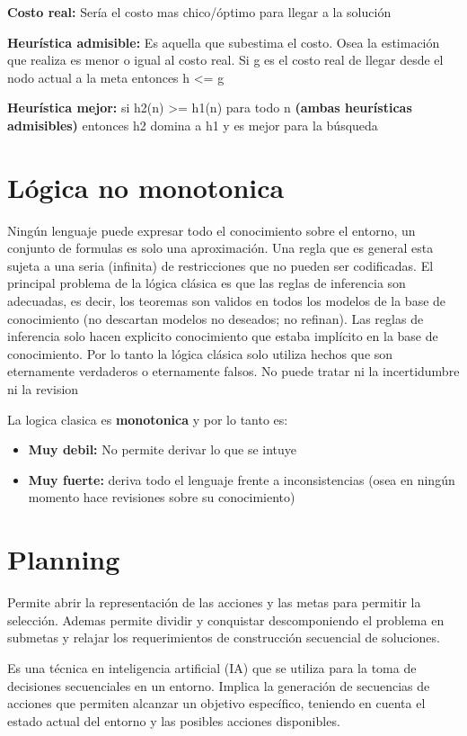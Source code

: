 \textbf{Costo real: }Sería el costo mas chico/óptimo para llegar a la solución

\textbf{Heurística admisible: }Es aquella que subestima el costo. Osea la estimación que realiza es menor o igual al costo real. Si g es el costo real de llegar desde el nodo actual a la meta entonces h <= g 

\textbf{Heurística mejor: }si h2(n) >= h1(n) para todo n \textbf{(ambas heurísticas admisibles)} entonces h2 domina a h1 y es mejor para la búsqueda


\section{Lógica no monotonica}
Ningún lenguaje puede expresar todo el conocimiento sobre el entorno, un conjunto de formulas es solo una aproximación. Una regla que es general esta sujeta a una seria (infinita) de restricciones que no pueden ser codificadas. El principal problema de la lógica clásica es que las reglas de inferencia son adecuadas, es decir, los teoremas son validos en todos los modelos de la base de conocimiento (no descartan modelos no deseados; no refinan). Las reglas de inferencia solo hacen explicito conocimiento que estaba implícito en la base de conocimiento. Por lo tanto la lógica clásica solo utiliza hechos que son eternamente verdaderos o eternamente falsos. No puede tratar ni la incertidumbre ni la revision

La logica clasica es \textbf{monotonica} y por lo tanto es:
\begin{itemize}
  \item \textbf{Muy debil: }No permite derivar lo que se intuye
  \item \textbf{Muy fuerte: }deriva todo el lenguaje frente a inconsistencias (osea en ningún momento hace revisiones sobre su conocimiento)
\end{itemize}

\section{Planning} 
Permite abrir la representación de las acciones y las metas para permitir la selección. Ademas permite dividir y conquistar descomponiendo el problema en submetas y relajar los requerimientos de construcción secuencial de soluciones.

Es una técnica en inteligencia artificial (IA) que se utiliza para la toma de decisiones secuenciales en un entorno. Implica la generación de secuencias de acciones que permiten alcanzar un objetivo específico, teniendo en cuenta el estado actual del entorno y las posibles acciones disponibles. 

